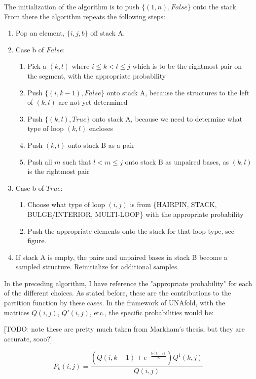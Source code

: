 The initialization of the algorithm is to push $\{(1, n), False\}$
onto the stack. From there the algorithm repeats the following steps:

\begin{enumerate}
\item Pop an element, $\{i, j, b\}$ off stack A.
\item Case b of $False$:
\begin{enumerate}
\item Pick a $(k, l)$ where $i \leq k < l \leq j$ which is to be the rightmost pair on the segment, with the appropriate probability
\item Push $\{(i, k-1), False\}$ onto stack A, because the structures to the left of $(k,l)$ are not yet determined
\item Push $\{(k, l), True\}$ onto stack A, because we need to determine what type of loop $(k,l)$ encloses
\item Push $(k,l)$ onto stack B as a pair
\item Push all $m$ such  that $l < m \leq j$ onto stack B as unpaired bases, as $(k,l)$ is the rightmost pair
\end{enumerate}
\item Case b of $True$:
\begin{enumerate}
\item Choose what type of loop $(i,j)$ is from \{HAIRPIN, STACK, BULGE/INTERIOR, MULTI-LOOP\} with the appropriate probability
\item Push the appropriate elements onto the stack for that loop type, see figure.
\end{enumerate}
\item If stack A is empty, the pairs and unpaired bases in stack B become a sampled structure. Reinitialize for additional samples.
\end{enumerate}

In the preceding algorithm, I have reference the "appropriate
probability" for each of the different choices. As stated before,
these are the contributions to the partition function by these
cases. In the framework of UNAfold, with the matrices $Q(i,j)$,
$Q'(i,j)$, etc., the specific probabilities would be:

[TODO: note these are pretty much taken from Markham's thesis, but they are accurate, sooo?]

\begin{equation}
P_k(i,j) = \frac{\left ( Q(i, k-1) + e^{-\frac{b(k-i)}{RT} }\right ) Q^1(k, j)}{Q(i,j)}
\end{equation}

